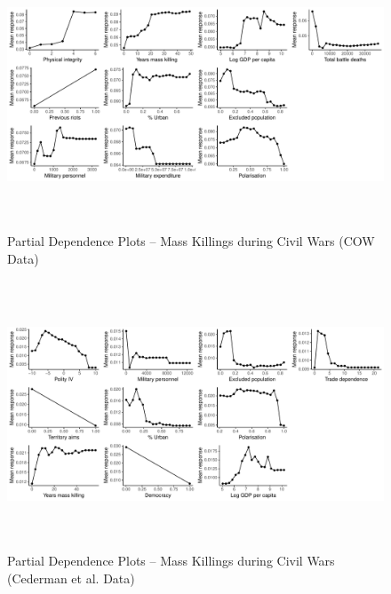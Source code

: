 \documentclass[a4paper,12pt]{article}
\begin{document}
\begin{figure}[H]
    \begin{center}
    \includegraphics[width=\textwidth, height=8cm]{images/rf-cow-pd.pdf}
    \caption{Partial Dependence Plots -- Mass Killings during Civil Wars (COW Data)}
    \label{fig:drfdpp3}
    \end{center}
\end{figure}	
	
\begin{figure}[H]
    \begin{center}
    \includegraphics[width=\textwidth, height=8cm]{images/rf-eth-pd.pdf}
    \caption{Partial Dependence Plots -- Mass Killings during Civil Wars (Cederman et al. Data)}
    \label{fig:drfdpp4}
    \end{center}
\end{figure}
	
\end{document}

